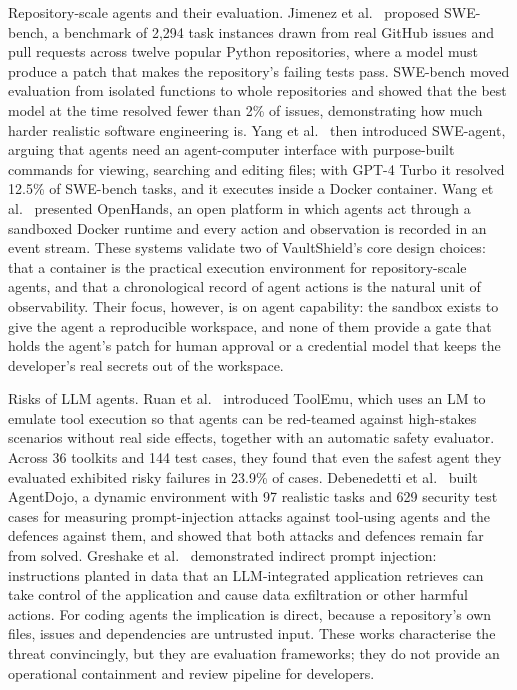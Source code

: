 \documentclass[12pt,a4paper,oneside]{report}
\begin{document}
Repository-scale agents and their evaluation. Jimenez et al.~\cite{ref2} proposed SWE-bench, a benchmark of 2,294 task instances drawn from real GitHub issues and pull requests across twelve popular Python repositories, where a model must produce a patch that makes the repository's failing tests pass. SWE-bench moved evaluation from isolated functions to whole repositories and showed that the best model at the time resolved fewer than 2\% of issues, demonstrating how much harder realistic software engineering is. Yang et al.~\cite{ref3} then introduced SWE-agent, arguing that agents need an agent-computer interface with purpose-built commands for viewing, searching and editing files; with GPT-4 Turbo it resolved 12.5\% of SWE-bench tasks, and it executes inside a Docker container. Wang et al.~\cite{ref4} presented OpenHands, an open platform in which agents act through a sandboxed Docker runtime and every action and observation is recorded in an event stream. These systems validate two of VaultShield's core design choices: that a container is the practical execution environment for repository-scale agents, and that a chronological record of agent actions is the natural unit of observability. Their focus, however, is on agent capability: the sandbox exists to give the agent a reproducible workspace, and none of them provide a gate that holds the agent's patch for human approval or a credential model that keeps the developer's real secrets out of the workspace.

Risks of LLM agents. Ruan et al.~\cite{ref5} introduced ToolEmu, which uses an LM to emulate tool execution so that agents can be red-teamed against high-stakes scenarios without real side effects, together with an automatic safety evaluator. Across 36 toolkits and 144 test cases, they found that even the safest agent they evaluated exhibited risky failures in 23.9\% of cases. Debenedetti et al.~\cite{ref6} built AgentDojo, a dynamic environment with 97 realistic tasks and 629 security test cases for measuring prompt-injection attacks against tool-using agents and the defences against them, and showed that both attacks and defences remain far from solved. Greshake et al.~\cite{ref7} demonstrated indirect prompt injection: instructions planted in data that an LLM-integrated application retrieves can take control of the application and cause data exfiltration or other harmful actions. For coding agents the implication is direct, because a repository's own files, issues and dependencies are untrusted input. These works characterise the threat convincingly, but they are evaluation frameworks; they do not provide an operational containment and review pipeline for developers.
\end{document}
